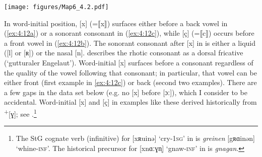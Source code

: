 \begin{map}
\texttt{[image: figures/Map6\_4.2.pdf]}
  \caption[Westphalian]{Westphalian (Wph). Squares indicate postsonorant velar fronting and circles the absence of postsonorant velar fronting. 1=\citet{Holthausen1886}, 2=\citet{Hoffmann1887}, 3=\citet{Collitz1899}, 4=\citet{Böger1906}, 5=\citet{Beisenherz1907}, 6=\citet{Arens1908}, 7=\citet{Schwagmeyer1908}, 8=\citet{Brand1914}, 9=\citet{Herdemann1921}, 10=\citet{Wix1921}, 11=\citet{Götz1922} (), 12=\citet{Götz1922} (), 13=\citet{Martin1925}, 14=\citet{Gregory1934}, 15=\citet{Hellberg1936}, 16=\citet{Holtmann1939}, 17=\citet{Schulte1941}, 18=\citet{Martin1942} (), 19=\citet{Martin1942} (), 20=\citet{Martin1942} (), 21=\citet{Rakers1944}, 22=\citet{Borchert1955}, 23=\citet{Frebel1957}, 24=\citet{Keller1961}, 25=\citet{BethgeBonnin1969} (Kreis ), 26=\citet{Seymour1970}, 27=\citet{Bethge1970}, 28=\citet{Stellmacher1972}, 29=\citet{Niebaum1974, Niebaum1982}, 30=\citet{NiebaumTeepe1976}, 31=\citet{Brandes2011}.}
  \label{fig:4.2}\label{map:6}
\end{map}

In word-initial position, [x] (=⟦x⟧) surfaces either before a back vowel in (\ref{ex:4:12a}) or a sonorant consonant in (\ref{ex:4:12c}), while [ç] (=⟦c⟧) occurs before a front vowel in (\ref{ex:4:12b}). The sonorant consonant after [x] in  is either a liquid ([l] or [ʀ]) or the nasal [n]. \citet[9]{Holthausen1886} describes the rhotic consonant as a dorsal fricative (‘gutturaler Engelaut’). Word-initial [x] surfaces before a consonant regardless of the quality of the vowel following that consonant; in particular, that vowel can be either front (first example in \ref{ex:4:12c}) or back (second two examples). There are a few gaps in the data set below (e.g. no [x] before [ɔː]), which I consider to be accidental. Word-initial [x] and [ç] in examples like these derived historically from  \textsuperscript{+}[ɣ]; see \citet[44]{Holthausen1886}.\footnote{{The StG cognate verb (infinitive) for [xʀuinə] ‘cry-}\textrm{\textsc{1sg}}\textrm{’ in  is} \textrm{\textit{greinen}} \textrm{[gʀɑinən] ‘whine-}\textrm{\textsc{inf}}\textrm{’. The historical precursor for [xnɑːɣn̩] ‘gnaw-}\textrm{\textsc{inf}}\textrm{’ in  is } \textrm{\textit{gnagan}}.}

